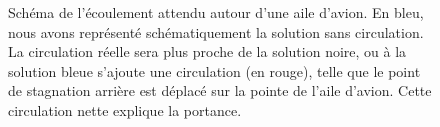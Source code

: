 \begin{figure}
  \scalebox{0.7}{}
   \caption{Schéma de l'écoulement attendu autour d'une aile d'avion. En bleu, nous avons représenté schématiquement la solution sans circulation. La circulation réelle sera plus proche de la solution noire, ou à la solution bleue s'ajoute une circulation (en rouge), telle que le point de stagnation arrière est déplacé sur la pointe de l'aile d'avion. Cette circulation nette explique la portance. }
   \label{fig:airfoil_schematic}
\end{figure}
